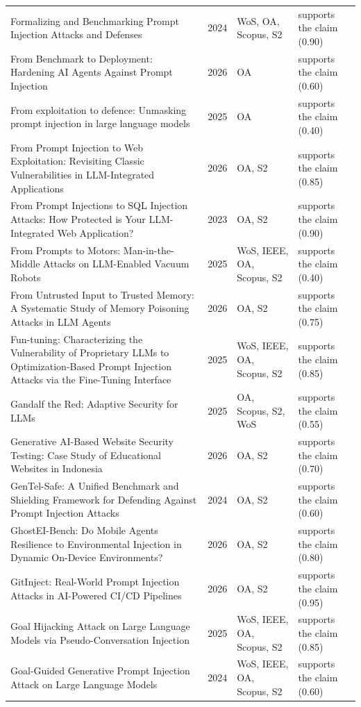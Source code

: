 \begin{longtable}{@{}%
  >{\raggedright\arraybackslash}p{}c%
  >{\raggedright\arraybackslash}p{}%
  >{\raggedright\arraybackslash}p{}@{}}
Formalizing and Benchmarking Prompt Injection Attacks and Defenses & 2024 & WoS, OA, Scopus, S2 & supports the claim (0.90) \\
From Benchmark to Deployment: Hardening AI Agents Against Prompt Injection & 2026 & OA & supports the claim (0.60) \\
From exploitation to defence: Unmasking prompt injection in large language models & 2025 & OA & supports the claim (0.40) \\
From Prompt Injection to Web Exploitation: Revisiting Classic Vulnerabilities in LLM-Integrated Applications & 2026 & OA, S2 & supports the claim (0.85) \\
From Prompt Injections to SQL Injection Attacks: How Protected is Your LLM-Integrated Web Application? & 2023 & OA, S2 & supports the claim (0.90) \\
From Prompts to Motors: Man-in-the-Middle Attacks on LLM-Enabled Vacuum Robots & 2025 & WoS, IEEE, OA, Scopus, S2 & supports the claim (0.40) \\
From Untrusted Input to Trusted Memory: A Systematic Study of Memory Poisoning Attacks in LLM Agents & 2026 & OA, S2 & supports the claim (0.75) \\
Fun-tuning: Characterizing the Vulnerability of Proprietary LLMs to Optimization-Based Prompt Injection Attacks via the Fine-Tuning Interface & 2025 & WoS, IEEE, OA, Scopus, S2 & supports the claim (0.85) \\
Gandalf the Red: Adaptive Security for LLMs & 2025 & OA, Scopus, S2, WoS & supports the claim (0.55) \\
Generative AI-Based Website Security Testing: Case Study of Educational Websites in Indonesia & 2026 & OA, S2 & supports the claim (0.70) \\
GenTel-Safe: A Unified Benchmark and Shielding Framework for Defending Against Prompt Injection Attacks & 2024 & OA, S2 & supports the claim (0.60) \\
GhostEI-Bench: Do Mobile Agents Resilience to Environmental Injection in Dynamic On-Device Environments? & 2026 & OA, S2 & supports the claim (0.80) \\
GitInject: Real-World Prompt Injection Attacks in AI-Powered CI/CD Pipelines & 2026 & OA, S2 & supports the claim (0.95) \\
Goal Hijacking Attack on Large Language Models via Pseudo-Conversation Injection & 2025 & WoS, IEEE, OA, Scopus, S2 & supports the claim (0.85) \\
Goal-Guided Generative Prompt Injection Attack on Large Language Models & 2024 & WoS, IEEE, OA, Scopus, S2 & supports the claim (0.60) \\

\end{longtable}
